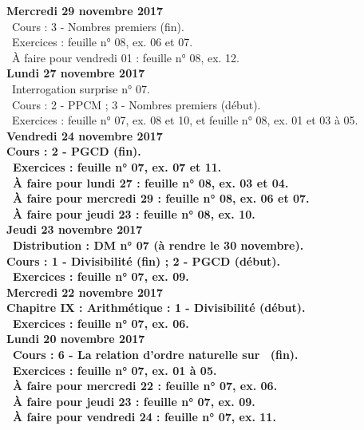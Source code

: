 \documentclass[12pt,a4paper]{article}
\begin{document}
\noindent\textbf{\bf Mercredi 29 novembre 2017}\\
\bu\ Cours : 3 - Nombres premiers (fin).\\
\bu\ Exercices : feuille n° 08, ex. 06 et 07.\\
\bu\ À faire pour vendredi 01 : feuille n° 08, ex. 12.\vspace{.4cm}\\

\noindent\textbf{Lundi 27 novembre 2017}\\
\bu\ Interrogation surprise n° 07.\\
\bu\ Cours : 2 - PPCM ; 3 - Nombres premiers (début).\\
\bu\ Exercices : feuille n° 07, ex. 08 et 10, et feuille n° 08, ex. 01 et 03 à 05.\vspace{.4cm}\\

\noindent\textbf{Vendredi 24 novembre 2017}\\
\bf Cours : 2 - PGCD (fin).\\
\bu\ Exercices : feuille n° 07, ex. 07 et 11.\\
\bu\ À faire pour lundi 27 : feuille n° 08, ex. 03 et 04.\\
\bu\ À faire pour mercredi 29 : feuille n° 08, ex. 06 et 07.\\
\bu\ À faire pour jeudi 23 : feuille n° 08, ex. 10.\vspace{.4cm}\\

\noindent\textbf{Jeudi 23 novembre 2017}\\
\bu\ Distribution : DM n° 07 (à rendre le 30 novembre).\\
\bf Cours : 1 - Divisibilité (fin) ; 2 - PGCD (début).\\
\bu\ Exercices : feuille n° 07, ex. 09.\\

\noindent\textbf{\bf Mercredi 22 novembre 2017}\\
\bf Chapitre IX \rm : Arithmétique : 1 - Divisibilité (début).\\
\bu\ Exercices : feuille n° 07, ex. 06.\\

\noindent\textbf{Lundi 20 novembre 2017}\\
 \bu\ Cours : 6 - La relation d'ordre naturelle sur \R\ (fin).\\
\bu\ Exercices : feuille n° 07, ex. 01 à 05.\\
\bu\ À faire pour mercredi 22 : feuille n° 07, ex. 06.\\
\bu\ À faire pour jeudi 23 : feuille n° 07, ex. 09.\\
\bu\ À faire pour vendredi 24 : feuille n° 07, ex. 11.\vspace{.4cm}\\
\end{document}
